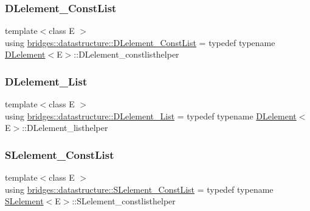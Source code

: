 \mbox{\label{namespacebridges_1_1datastructure_a89a5bc532207f3279ad747ba91e75527}} 
\subsubsection{\texorpdfstring{D\+Lelement\+\_\+\+Const\+List}{DLelement\_ConstList}}
{\footnotesize\ttfamily template$<$class E $>$ \\
using \hyperlink{namespacebridges_1_1datastructure_a89a5bc532207f3279ad747ba91e75527}{bridges\+::datastructure\+::\+D\+Lelement\+\_\+\+Const\+List} = typedef typename \hyperlink{classbridges_1_1datastructure_1_1_d_lelement}{D\+Lelement}$<$E$>$\+::D\+Lelement\+\_\+constlisthelper}

\mbox{\label{namespacebridges_1_1datastructure_a3bc755a675bce8fd5e0fefd10bb72977}} 
\subsubsection{\texorpdfstring{D\+Lelement\+\_\+\+List}{DLelement\_List}}
{\footnotesize\ttfamily template$<$class E $>$ \\
using \hyperlink{namespacebridges_1_1datastructure_a3bc755a675bce8fd5e0fefd10bb72977}{bridges\+::datastructure\+::\+D\+Lelement\+\_\+\+List} = typedef typename \hyperlink{classbridges_1_1datastructure_1_1_d_lelement}{D\+Lelement}$<$E$>$\+::D\+Lelement\+\_\+listhelper}

\mbox{\label{namespacebridges_1_1datastructure_adc1ea9eeab8d889046a192dc16743190}} 
\subsubsection{\texorpdfstring{S\+Lelement\+\_\+\+Const\+List}{SLelement\_ConstList}}
{\footnotesize\ttfamily template$<$class E $>$ \\
using \hyperlink{namespacebridges_1_1datastructure_adc1ea9eeab8d889046a192dc16743190}{bridges\+::datastructure\+::\+S\+Lelement\+\_\+\+Const\+List} = typedef typename \hyperlink{classbridges_1_1datastructure_1_1_s_lelement}{S\+Lelement}$<$E$>$\+::S\+Lelement\+\_\+constlisthelper}

